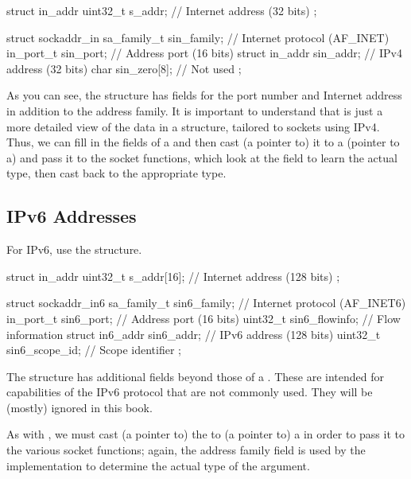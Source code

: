 \begin{inlinecode}
struct in_addr {
    uint32_t s_addr;       // Internet address (32 bits)
};

struct sockaddr_in {
    sa_family_t sin_family;    // Internet protocol (AF_INET)
    in_port_t sin_port;        // Address port (16 bits)
    struct in_addr sin_addr;   // IPv4 address (32 bits)
    char sin_zero[8];          // Not used
};
\end{inlinecode}

As you can see, the  structure has fields for
the port number and Internet address in addition to the address
family.  It is important to understand that  is
just a more detailed view of the data in a  structure,
tailored to sockets using IPv4.  Thus, we can fill in the
fields of a  and then cast (a pointer to) it to
a (pointer to a)  and
pass it to the socket functions, which look at the
 field to learn the actual type, then cast back
to the appropriate type.

\subsection{IPv6 Addresses}

For IPv6, use the  structure.

\begin{inlinecode}
struct in_addr {
    uint32_t s_addr[16];       // Internet address (128 bits)
};

struct sockaddr_in6 {
    sa_family_t sin6_family;   // Internet protocol (AF_INET6)
    in_port_t sin6_port;       // Address port (16 bits)
    uint32_t sin6_flowinfo;    // Flow information
    struct in6_addr sin6_addr; // IPv6 address (128 bits)
    uint32_t sin6_scope_id;    // Scope identifier
};
\end{inlinecode}

The  structure has
additional fields beyond those of a .
These are intended for capabilities of the IPv6 protocol that are not
commonly used.  They will be (mostly) ignored in this book.

As with ,
we must cast (a pointer to) the  to (a
pointer to) a  in
order to pass it to the various socket functions;  again,
the address family field is used by the implementation to
determine the actual type of the argument.

